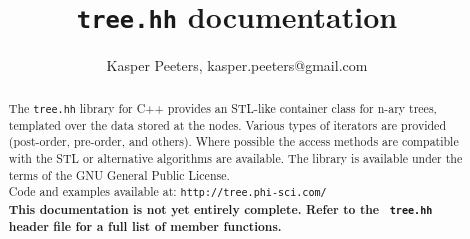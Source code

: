 \documentclass[11pt]{article}
\begin{document}
\title{{\tt tree.hh} documentation}
\author{Kasper Peeters, kasper.peeters@gmail.com}
\maketitle
\begin{abstract}
The {\tt tree.hh} library for C++ provides an STL-like container class
for n-ary trees, templated over the data stored at the nodes.  Various
types of iterators are provided (post-order, pre-order, and
others). Where possible the access methods are compatible with the STL
or alternative algorithms are available. The library is available
under the terms of the GNU General Public License.\\[3ex]
Code and examples available at: {\tt http://tree.phi-sci.com/}\\[3ex]
{\bf This documentation is not yet entirely complete. Refer to the {\tt
tree.hh} header file for a full list of member functions.}
\end{abstract}
\vfill
\tableofcontents
\eject
\end{document}
